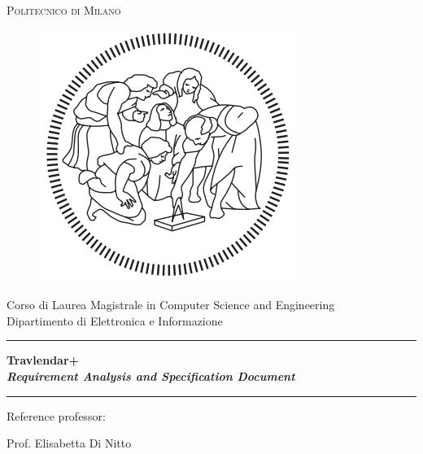 \documentclass[a4paper,12pt,twoside]{report}
\begin{document}

\thispagestyle{empty}
\enlargethispage{60mm}
\begin{center}
\Large{\textsc{Politecnico di Milano}}\\
\begin{figure}[h]
\begin{center}
\includegraphics[scale=0.25]{images/logoPolimi.png}
\end{center}
\end{figure}
\vspace{-8mm}
\large{Corso di Laurea Magistrale in Computer Science and Engineering}\\
\large{Dipartimento di Elettronica e Informazione}\\
\vspace{25mm}

\begin{center}
\noindent\rule{17cm}{0.4pt}
\end{center}

\vspace{1mm}
{\textbf{\Huge{Travlendar+}}} \\
\vspace{5mm}
{\textbf{\textit{\Large{Requirement Analysis and Specification Document}}}}


\noindent\rule{17cm}{0.4pt}

\vspace{20mm}

\begin{center}
Reference professor:
\vspace{-4mm}
\end{center}
\begin{center}
Prof. Elisabetta Di Nitto
\end{center}


\end{center}
\end{document}
